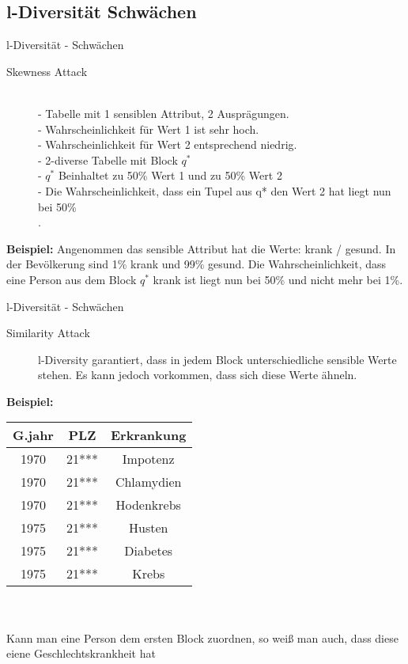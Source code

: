\subsection{l-Diversität Schwächen}

\begin{frame}{l-Diversität - Schwächen}

\begin{description}
	\item[Skewness Attack] \ \\
    - Tabelle mit 1 sensiblen Attribut, 2 Ausprägungen.\\
    - Wahrscheinlichkeit für Wert 1 ist sehr hoch.\\
    - Wahrscheinlichkeit für Wert 2 entsprechend niedrig.\\
    - 2-diverse Tabelle mit Block $q^*$\\
    - $q^*$ Beinhaltet zu 50\% Wert 1 und zu 50\%  Wert 2\\
    - Die Wahrscheinlichkeit, dass ein Tupel aus q* den Wert 2 hat liegt nun bei 50\%  \\
    \tiny \cite{Li2007t-closseness}. 
\end{description}
\vspace{0.5cm}

\textbf{Beispiel:} Angenommen das sensible Attribut hat die Werte: krank / gesund. In der Bevölkerung sind 1\% krank und 99\% gesund. Die Wahrscheinlichkeit, dass eine Person aus dem Block $q^*$ krank ist liegt nun bei 50\% und nicht mehr bei 1\%.
\end{frame}

\begin{frame}{l-Diversität - Schwächen}
\begin{description}	
	\item[Similarity Attack] l-Diversity garantiert, dass in jedem Block unterschiedliche sensible Werte stehen. Es kann jedoch vorkommen, dass sich diese Werte ähneln. \\
    \tiny \cite{Li2007t-closseness} 
\end{description}
\normalsize
\textbf{Beispiel:} 
	\begin{tabular}{|c|c|c|}
		\hline \textbf{G.jahr} & \textbf{PLZ} & \textbf{Erkrankung} \\
		\hline
		1970 & 21*** & Impotenz \\ 
		1970 & 21*** & Chlamydien \\ 
		1970 & 21*** & Hodenkrebs \\
		\hline 
		1975 & 21*** & Husten \\
		1975 & 21*** & Diabetes \\ 
		1975 & 21*** & Krebs \\ 
		\hline 
	\end{tabular} \\
	\ \\
	Kann man eine Person dem ersten Block zuordnen, so weiß man auch, dass diese eiene Geschlechtskrankheit hat

\end{frame}
